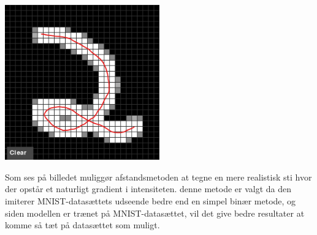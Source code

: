 \documentclass{article}
\begin{document}
\begin{center}
  \includegraphics[width=0.5\textwidth]{drawingpad.png}
  \label{fig:drawingpad}
\end{center}
Som ses på billedet muliggør afstandsmetoden at tegne en mere realistisk sti hvor der opstår et naturligt gradient i intensiteten. denne metode er valgt da den imiterer MNIST-datasættets udseende bedre end en simpel binær metode, og siden modellen er trænet på MNIST-datasættet, vil det give bedre resultater at komme så tæt på datasættet som muligt. 
\end{document}
